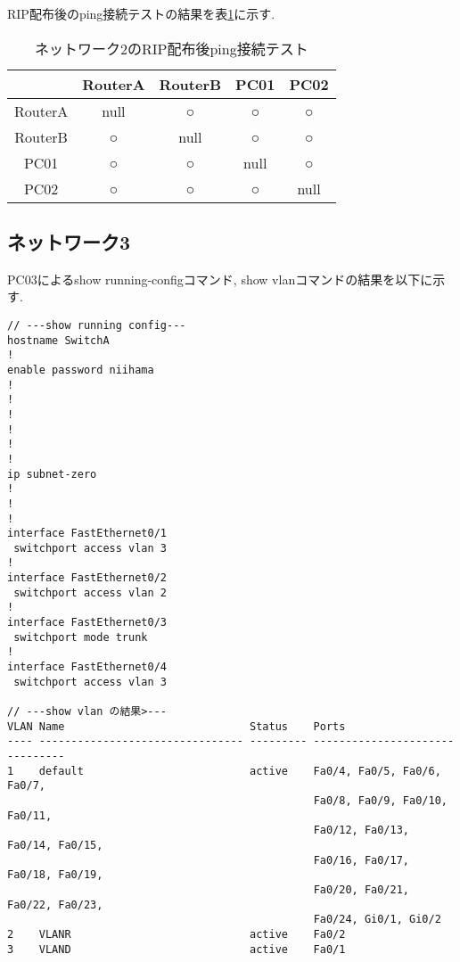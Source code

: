 \documentclass{jsarticle}
\begin{document}
RIP配布後のping接続テストの結果を表\ref{tab:ping2_rip}に示す. 

\begin{table}[htb]
  \begin{center}
    \caption{ネットワーク2のRIP配布後ping接続テスト}
    \begin{tabular}{|c|c|c|c|c|} \hline
       &  RouterA & RouterB  & PC01 & PC02\\ \hline 
RouterA & null & ○ & ○ & ○ \\ \hline 
RouterB & ○ & null & ○ & ○ \\ \hline 
PC01 & ○ & ○ & null & ○ \\ \hline 
PC02 & ○ & ○ & ○ & null \\ \hline 
    \end{tabular}
	\label{tab:ping2_rip}
  \end{center}
\end{table}


\subsection{ネットワーク3}

PC03によるshow running-configコマンド, show vlanコマンドの結果を以下に示す. 

\begin{lstlisting}[basicstyle=\ttfamily\small, frame=single]
// ---show running config---
hostname SwitchA
!
enable password niihama
!
!
!
!
!
!
ip subnet-zero
!
!
!
interface FastEthernet0/1
 switchport access vlan 3
!
interface FastEthernet0/2
 switchport access vlan 2
!
interface FastEthernet0/3
 switchport mode trunk
!
interface FastEthernet0/4
 switchport access vlan 3

// ---show vlan の結果>---
VLAN Name                             Status    Ports
---- -------------------------------- --------- -------------------------------
1    default                          active    Fa0/4, Fa0/5, Fa0/6, Fa0/7,
                                                Fa0/8, Fa0/9, Fa0/10, Fa0/11,
                                                Fa0/12, Fa0/13, Fa0/14, Fa0/15,
                                                Fa0/16, Fa0/17, Fa0/18, Fa0/19,
                                                Fa0/20, Fa0/21, Fa0/22, Fa0/23,
                                                Fa0/24, Gi0/1, Gi0/2
2    VLANR                            active    Fa0/2
3    VLAND                            active    Fa0/1
\end{lstlisting}
\end{document}
